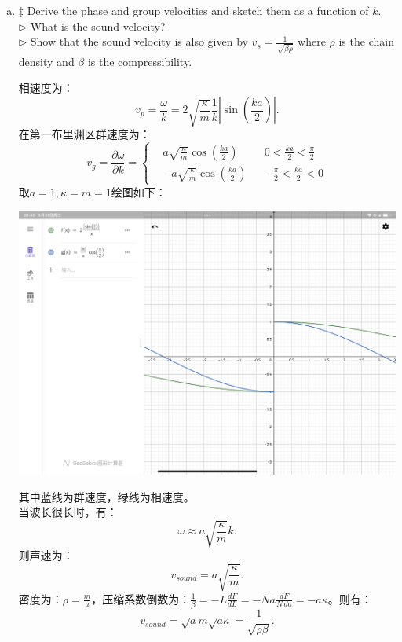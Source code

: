 \documentclass[reqno,a4paper,12pt]{amsart}
\begin{document}
\begin{enumerate}[(a)]
	\item $\ddagger$ Derive the phase and group velocities and sketch them as a function of $k$. \\
	$\triangleright$ What is the sound velocity? \\
	$\triangleright$ Show that the sound velocity is also given by $v_s = \frac{1}{\sqrt{\beta\rho}}$ where $\rho$ is the chain density and $\beta$ is the compressibility.
	\begin{tcolorbox}[breakable, colback = black!5!white, colframe = black]
	相速度为：
	\[
		v_p = \frac{\omega}{k} = 2\sqrt{\frac{\kappa}{m}}\frac{1}{k} \left\vert \sin\left( \frac{ka}{2} \right) \right\vert.
	\]
	在第一布里渊区群速度为：
	\[
		v_g = \frac{\partial \omega}{\partial k} = \left\{ \begin{aligned}
		&a\sqrt{\frac{\kappa}{m}}\cos\left( \frac{ka}{2} \right) &  &0<\frac{ka}{2} < \frac{\pi}{2}\\
		&-a\sqrt{\frac{\kappa}{m}}\cos\left( \frac{ka}{2} \right) & &-\frac{\pi}{2} <\frac{ka}{2} < 0 
	\end{aligned}\right.
	\]
	取$a = 1,\kappa = m = 1$绘图如下：
	\begin{center}
		\includegraphics[scale=0.32]{9-2.png}
	\end{center}
	其中蓝线为群速度，绿线为相速度。 \\
	当波长很长时，有：
	\[
		\omega \approx a\sqrt{\frac{\kappa}{m}}k.
	\]
	则声速为：
	\[
		v_{sound} = a\sqrt{\frac{\kappa}{m}}.
	\]
	密度为：$\rho = \frac{m}{a}$，压缩系数倒数为：$\frac{1}{\beta} = -L\frac{dF}{dL} = -Na\frac{dF}{N\,da} = -a\kappa$。则有：
	\[
		v_{sound} = \sqrt{a}{m}\sqrt{a\kappa} = \frac{1}{\sqrt{\rho\beta}}.
	\]
	\end{tcolorbox}
	

\end{enumerate}
\end{document}
